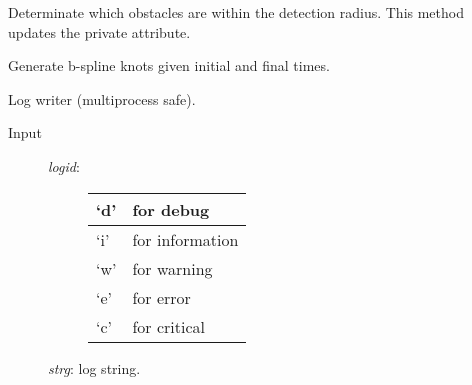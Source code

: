 \documentclass[letterpaper,10pt,english]{sphinxmanual}
\begin{document}
\begin{fulllineitems}
\begin{fulllineitems}
\end{fulllineitems}


\begin{fulllineitems}
\label{Multi-robot motion planner:planning_sim.Robot._detect_obst}
Determinate which obstacles are within the detection radius.
This method updates the 
private attribute.

\end{fulllineitems}


\begin{fulllineitems}
\label{Multi-robot motion planner:planning_sim.Robot._gen_knots}
Generate b-spline knots given initial and final times.

\end{fulllineitems}


\begin{fulllineitems}
\label{Multi-robot motion planner:planning_sim.Robot._log}
Log writer (multiprocess safe).
\begin{description}
\item[{Input}] \leavevmode\begin{description}
\item[{\emph{logid}:}] \leavevmode
\begin{tabulary}{\linewidth}{|L|L|}
\hline

`d'
 & 
for debug
\\
\hline
`i'
 & 
for information
\\
\hline
`w'
 & 
for warning
\\
\hline
`e'
 & 
for error
\\
\hline
`c'
 & 
for critical
\\
\hline\end{tabulary}


\end{description}

\emph{strg}: log string.

\end{description}

\end{fulllineitems}


\end{fulllineitems}
\end{document}
